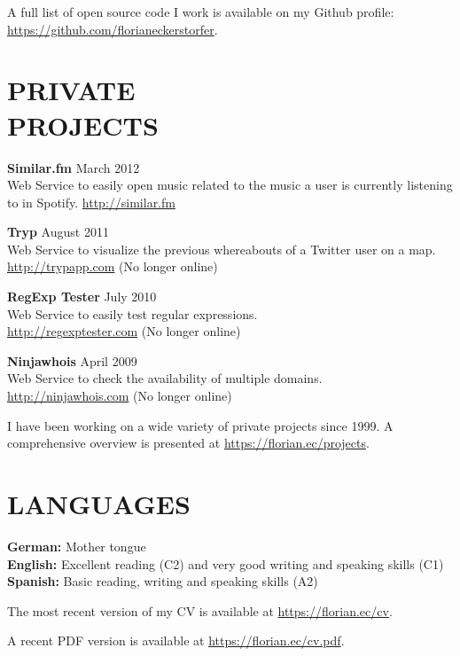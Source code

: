 \documentclass[margin]{res}
\begin{document}
\begin{resume}
A full list of open source code I work is available on my Github profile: \url{https://github.com/florianeckerstorfer}.

\section{PRIVATE \\ PROJECTS}

\textbf{Similar.fm} \hfill March 2012 \\
  Web Service to easily open music related to the music a user is currently listening to in Spotify. \url{http://similar.fm}

\textbf{Tryp} \hfill August 2011 \\
  Web Service to visualize the previous whereabouts of a Twitter user on a map. \\ \url{http://trypapp.com} (No longer online)

\textbf{RegExp Tester} \hfill July 2010 \\
  Web Service to easily test regular expressions. \\ \url{http://regexptester.com} (No longer online)

\textbf{Ninjawhois} \hfill April 2009 \\
  Web Service to check the availability of multiple domains. \\ \url{http://ninjawhois.com} (No longer online)

I have been working on a wide variety of private projects since 1999. A comprehensive overview is presented at \url{https://florian.ec/projects}.


\section{LANGUAGES}

\textbf{German:} Mother tongue \\
\textbf{English:} Excellent reading (C2) and very good writing and speaking skills (C1) \\
\textbf{Spanish:} Basic reading, writing and speaking skills (A2)


\end{resume}

\vspace{15 mm}

The most recent version of my CV is available at \url{https://florian.ec/cv}.

A recent PDF version is available at \url{https://florian.ec/cv.pdf}.
\end{document}
